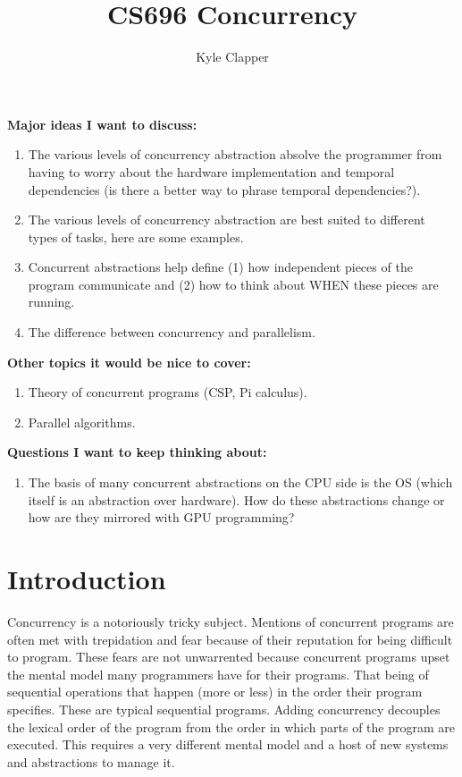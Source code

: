 \documentclass{article}
\title{CS696 Concurrency}
\author{Kyle Clapper}
\begin{document}
\maketitle


\textbf{Major ideas I want to discuss:}
\begin{enumerate}
  \item The various levels of concurrency abstraction absolve the programmer
        from having to worry about the hardware implementation and temporal
        dependencies (is there a better way to phrase temporal dependencies?).

  \item The various levels of concurrency abstraction are best suited to
        different types of tasks, here are some examples.

  \item Concurrent abstractions help define (1) how independent pieces of the
        program communicate and (2) how to think about WHEN these pieces are
        running.

  \item The difference between concurrency and parallelism.

\end{enumerate}

\textbf{Other topics it would be nice to cover:}
\begin{enumerate}
  \item Theory of concurrent programs (CSP, Pi calculus).

  \item Parallel algorithms.
\end{enumerate}

\textbf{Questions I want to keep thinking about:}
\begin{enumerate}
  \item The basis of many concurrent abstractions on the CPU side is the OS
        (which itself is an abstraction over hardware). How do these
        abstractions change or how are they mirrored with GPU programming?
\end{enumerate}

\section{Introduction}
Concurrency is a notoriously tricky subject. Mentions of concurrent programs are
often met with trepidation and fear because of their reputation for being
difficult to program. These fears are not unwarrented because concurrent
programs upset the mental model many programmers have for their programs. That
being of sequential operations that happen (more or less) in the order their
program specifies. These are typical sequential programs. Adding concurrency
decouples the lexical order of the program from the order in which parts of the
program are executed. This requires a very different mental model and a host of
new systems and abstractions to manage it.
\end{document}

